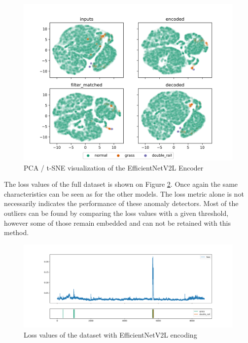 \begin{figure}[!ht]
    \centering
    \includegraphics[width=\textwidth,trim={0 0 0 1cm},clip]{./results/efficientnetv2l_vgg19/20230525_194238_feature_vectors_1.png}
    \caption{PCA / t-SNE visualization of the EfficientNetV2L Encoder}
    \label{fig:efficientnetv2l_pca}
\end{figure}

The loss values of the full dataset is shown on Figure \ref{fig:efficientnetv2l_loss}.
Once again the same characteristics can be seen as for the other models.
The loss metric alone is not necessarily indicates the performance of these anomaly detectors.
Most of the outliers can be found by comparing the loss values with a given threshold,
however some of those remain embedded and can not be retained with this method.

\begin{figure}[!ht]
    \centering
    \includegraphics[width=\textwidth,trim={0 1cm 0 1cm},clip]{./results/efficientnetv2l_vgg19/20230525_194238_feature_vectors_loss.png}
    \caption{Loss values of the dataset with EfficientNetV2L encoding}
    \label{fig:efficientnetv2l_loss}
\end{figure}

